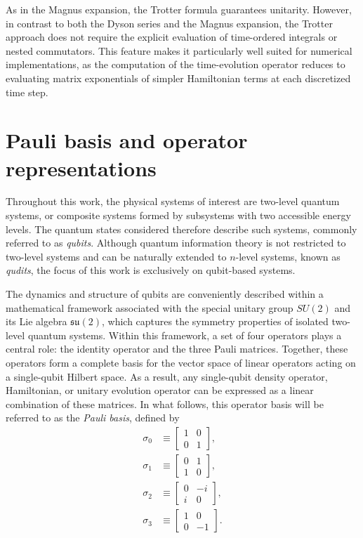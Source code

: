 As in the Magnus expansion, the Trotter formula guarantees unitarity. However, in contrast to both the Dyson series and the Magnus expansion, the Trotter approach does not require the explicit evaluation of time-ordered integrals or nested commutators. This feature makes it particularly well suited for numerical implementations, as the computation of the time-evolution operator reduces to evaluating matrix exponentials of simpler Hamiltonian terms at each discretized time step.

\section{Pauli basis and operator representations}
\label{sec:pauli_basis}
Throughout this work, the physical systems of interest are two-level quantum systems, or composite systems formed by subsystems with two accessible energy levels. The quantum states considered therefore describe such systems, commonly referred to as \textit{qubits}. Although quantum information theory is not restricted to two-level systems and can be naturally extended to $n$-level systems, known as \textit{qudits}, the focus of this work is exclusively on qubit-based systems.

The dynamics and structure of qubits are conveniently described within a mathematical framework associated with the special unitary group $SU(2)$ and its Lie algebra $\mathfrak{su}(2)$, which captures the symmetry properties of isolated two-level quantum systems. Within this framework, a set of four operators plays a central role: the identity operator and the three Pauli matrices. Together, these operators form a complete basis for the vector space of linear operators acting on a single-qubit Hilbert space. As a result, any single-qubit density operator, Hamiltonian, or unitary evolution operator can be expressed as a linear combination of these matrices. In what follows, this operator basis will be referred to as the \textit{Pauli basis}, defined by
\begin{align}
    \sigma_0 & \equiv
    \begin{bmatrix}
        1 & 0 \\
        0 & 1
    \end{bmatrix},    \\[1.2em]
    \sigma_1 & \equiv
    \begin{bmatrix}
        0 & 1 \\
        1 & 0
    \end{bmatrix},    \\[1.2em]
    \sigma_2 & \equiv
    \begin{bmatrix}
        0 & -i \\
        i & 0
    \end{bmatrix},    \\[1.2em]
    \sigma_3 & \equiv
    \begin{bmatrix}
        1 & 0  \\
        0 & -1
    \end{bmatrix}.
\end{align}

